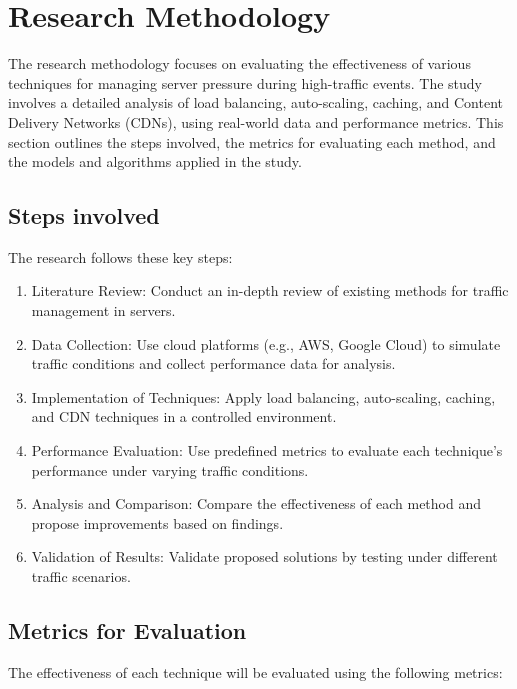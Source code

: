 \documentclass[a4paper, 12pt]{article}
\begin{document}
\section{Research Methodology}
The research methodology focuses on evaluating the effectiveness of various techniques for managing server pressure during high-traffic events. The study involves a detailed analysis of load balancing, auto-scaling, caching, and Content Delivery Networks (CDNs), using real-world data and performance metrics. This section outlines the steps involved, the metrics for evaluating each method, and the models and algorithms applied in the study.

\subsection{Steps involved}
The research follows these key steps:

\begin{enumerate}
    \item Literature Review: Conduct an in-depth review of existing methods for traffic management in servers.
    \item Data Collection: Use cloud platforms (e.g., AWS, Google Cloud) to simulate traffic conditions and collect performance data for analysis.
    \item Implementation of Techniques: Apply load balancing, auto-scaling, caching, and CDN techniques in a controlled environment.
    \item Performance Evaluation: Use predefined metrics to evaluate each technique's performance under varying traffic conditions.
    \item Analysis and Comparison: Compare the effectiveness of each method and propose improvements based on findings.
    \item Validation of Results: Validate proposed solutions by testing under different traffic scenarios.
    
\end{enumerate}

\subsection{Metrics for Evaluation}
The effectiveness of each technique will be evaluated using the following metrics:\\
\end{document}
